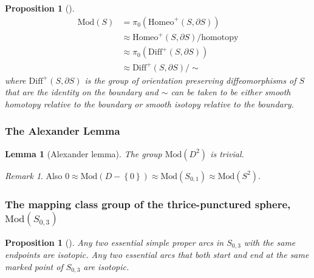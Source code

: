 \documentclass[reqno]{amsart}
\newtheorem{lemma}[theorem]{Lemma}
\newtheorem{proposition}[theorem]{Proposition}
\theoremstyle{definition}
\theoremstyle{remark}
\newtheorem*{remark}{Remark}
\newcommand{\Mod}{{\mathrm{Mod}}}
\newcommand{\Homeo}{{\mathrm{Homeo}}}
\begin{document}
\begin{proposition}[]
    \begin{align*}
        \Mod (S) 
        &= \pi_0 \left( \Homeo^{+} \left( S, \partial S \right) 
        \right) \\
        &\approx \Homeo^{+}\left( S, \partial S \right) /
        \text{homotopy}\\
        &\approx \pi_0 \left( \mathrm{Diff}^{+} \left( 
        S, \partial S \right)  \right) \\
        &\approx \textrm{Diff}^{+}\left( S, \partial S \right) /
        \sim
    \end{align*}
    where $\mathrm{Diff}^{+}\left( S, \partial S \right) $ is the group of
    orientation preserving diffeomorphisms of $S$ that are the
    identity on the boundary and $\sim$ can be taken to be either
    smooth homotopy relative to the boundary or smooth isotopy relative to the
    boundary.
\end{proposition}

\subsubsection*{The Alexander Lemma}

\begin{lemma}[Alexander lemma]
   The group $\Mod\left( D^2 \right) $ is trivial. 
\end{lemma}

\begin{remark}
    Also $0 \approx \Mod\left( D - \left\{ 0 \right\}  \right) 
    \approx \Mod \left( S_{0,1} \right) \approx
    \Mod\left( S^2 \right) $.
\end{remark}

\subsubsection*{The mapping class group of the thrice-punctured sphere,
$\Mod \left( S_{0,3} \right) $}

\begin{proposition}[]
    Any two essential simple proper arcs in $S_{0,3}$ with the
    same endpoints are isotopic. Any two essential arcs that both
    start and end at the same marked point of $S_{0,3}$ are isotopic.
\end{proposition}
\end{document}
